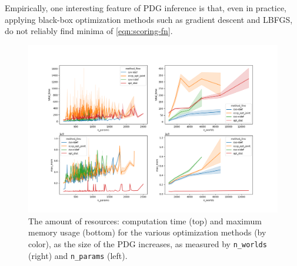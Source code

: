 \documentclass{article}
\begin{document}
Empirically, one interesting feature of PDG inference is that, even in practice, applying black-box optimization methods such as gradient descent and LBFGS, do not reliably find minima of \eqref{eqn:scoring-fn}.

\begin{figure}
    \includegraphics[width=\linewidth]{figs/resources-fine}
    \caption{
        The amount of resources: computation time (top) and maximum memory usage (bottom) for the various optimization methods (by color), as the size of the PDG increases, as measured by \texttt{n\_worlds} (right) and \texttt{n\_params} (left).
     }\label{fig:resources}
\end{figure}
\end{document}
